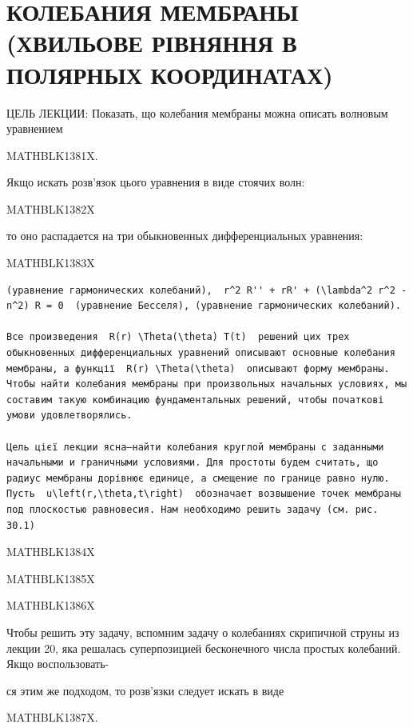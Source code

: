 \documentclass[
  ukrainian,
]{article}
\begin{document}
\section{КОЛЕБАНИЯ МЕМБРАНЫ (ХВИЛЬОВЕ РІВНЯННЯ В ПОЛЯРНЫХ
КООРДИНАТАХ)}\label{ux43aux43eux43bux435ux431ux430ux43dux438ux44f-ux43cux435ux43cux431ux440ux430ux43dux44b-ux445ux432ux438ux43bux44cux43eux432ux435-ux440ux456ux432ux43dux44fux43dux43dux44f-ux432-ux43fux43eux43bux44fux440ux43dux44bux445-ux43aux43eux43eux440ux434ux438ux43dux430ux442ux430ux445}

ЦЕЛЬ ЛЕКЦИИ: Показать, що колебания мембраны можна описать волновым
уравнением

MATHBLK1381X.

Якщо искать розв'язок цього уравнения в виде стоячих волн:

MATHBLK1382X

то оно распадается на три обыкновенных дифференциальных уравнения:

MATHBLK1383X

\begin{verbatim}
(уравнение гармонических колебаний),  r^2 R'' + rR' + (\lambda^2 r^2 - n^2) R = 0  (уравнение Бесселя), (уравнение гармонических колебаний).

Все произведения  R(r) \Theta(\theta) T(t)  решений цих трех обыкновенных дифференциальных уравнений описывают основные колебания мембраны, а функції  R(r) \Theta(\theta)  описывают форму мембраны. Чтобы найти колебания мембраны при произвольных начальных условиях, мы составим такую комбинацию фундаментальных решений, чтобы початкові умови удовлетворялись.

Цель цієї лекции ясна—найти колебания круглой мембраны с заданными начальными и граничными условиями. Для простоты будем считать, що радиус мембраны дорівнює единице, а смещение по границе равно нулю. Пусть  u\left(r,\theta,t\right)  обозначает возвышение точек мембраны под плоскостью равновесия. Нам необходимо решить задачу (см. рис. 30.1)
\end{verbatim}

MATHBLK1384X

MATHBLK1385X

MATHBLK1386X

Чтобы решить эту задачу, вспомним задачу о колебаниях скрипичной струны
из лекции 20, яка решалась суперпозицией бесконечного числа простых
колебаний. Якщо воспользовать-

ся этим же подходом, то розв'язки следует искать в виде

MATHBLK1387X.
\end{document}
